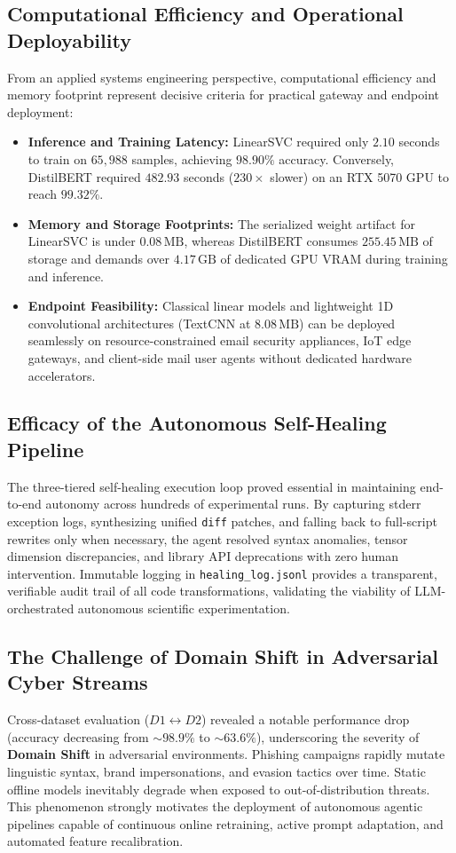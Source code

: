 \documentclass[conference]{IEEEtran}
\begin{document}
\subsection{Computational Efficiency and Operational Deployability}
From an applied systems engineering perspective, computational efficiency and memory footprint represent decisive criteria for practical gateway and endpoint deployment:
\begin{itemize}
    \item \textbf{Inference and Training Latency:} LinearSVC required only $2.10$ seconds to train on $65,988$ samples, achieving $98.90\%$ accuracy. Conversely, DistilBERT required $482.93$ seconds ($230\times$ slower) on an RTX 5070 GPU to reach $99.32\%$.
    \item \textbf{Memory and Storage Footprints:} The serialized weight artifact for LinearSVC is under $0.08\,\text{MB}$, whereas DistilBERT consumes $255.45\,\text{MB}$ of storage and demands over $4.17\,\text{GB}$ of dedicated GPU VRAM during training and inference.
    \item \textbf{Endpoint Feasibility:} Classical linear models and lightweight 1D convolutional architectures (TextCNN at $8.08\,\text{MB}$) can be deployed seamlessly on resource-constrained email security appliances, IoT edge gateways, and client-side mail user agents without dedicated hardware accelerators.
\end{itemize}

\subsection{Efficacy of the Autonomous Self-Healing Pipeline}
The three-tiered self-healing execution loop proved essential in maintaining end-to-end autonomy across hundreds of experimental runs. By capturing stderr exception logs, synthesizing unified \texttt{diff} patches, and falling back to full-script rewrites only when necessary, the agent resolved syntax anomalies, tensor dimension discrepancies, and library API deprecations with zero human intervention. Immutable logging in \texttt{healing\_log.jsonl} provides a transparent, verifiable audit trail of all code transformations, validating the viability of LLM-orchestrated autonomous scientific experimentation.

\subsection{The Challenge of Domain Shift in Adversarial Cyber Streams}
Cross-dataset evaluation ($D1 \leftrightarrow D2$) revealed a notable performance drop (accuracy decreasing from $\sim 98.9\%$ to $\sim 63.6\%$), underscoring the severity of \textbf{Domain Shift} in adversarial environments. Phishing campaigns rapidly mutate linguistic syntax, brand impersonations, and evasion tactics over time. Static offline models inevitably degrade when exposed to out-of-distribution threats. This phenomenon strongly motivates the deployment of autonomous agentic pipelines capable of continuous online retraining, active prompt adaptation, and automated feature recalibration.
\end{document}

